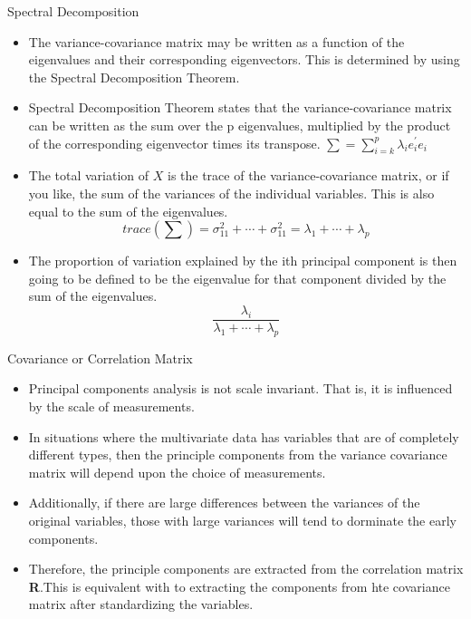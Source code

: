 \documentclass[10pt]{beamer}
\begin{document}
\begin{frame}{Spectral Decomposition}
\begin{itemize}
\item The variance-covariance matrix may be written as a function of the eigenvalues and their corresponding eigenvectors. This is determined by using the Spectral Decomposition Theorem. 
\item Spectral Decomposition Theorem states that the variance-covariance matrix can be written as the sum over the p eigenvalues, multiplied by the product of the corresponding eigenvector times its transpose.
$\sum=\sum_{i=k}^{p}\lambda_{i}e_{i}^{'}e_{i}$
\item The total variation of $X$ is the trace of the variance-covariance matrix, or if you like, the sum of the variances of the individual variables. This is also equal to the sum of the eigenvalues.$$trace(\sum)=\sigma_{11}^{2}+\cdots+\sigma_{11}^{2}=\lambda_{1}+\cdots+\lambda_{p}$$
\item The proportion of variation explained by the ith principal component is then going to be defined to be the eigenvalue for that component divided by the sum of the eigenvalues.$$\dfrac{\lambda_{i}}{\lambda_{1}+\cdots+\lambda_{p}}$$
\end{itemize}
\end{frame}

\begin{frame}[fragile]{Covariance or Correlation Matrix}
\begin{itemize}
\item Principal components analysis is not scale invariant. That is, it is influenced by the scale of measurements. 
\item In situations where the multivariate data has variables that are of completely different types, then the principle components from the variance covariance matrix will depend upon the choice of measurements.
\item Additionally, if there are large differences between the variances of the original variables, those with large variances will tend to dorminate the early components.
\item Therefore, the principle components are extracted from the correlation matrix \textbf{R}.This is equivalent with to extracting the components from hte covariance matrix after standardizing the variables.
\end{itemize}
\end{frame}
\end{document}
